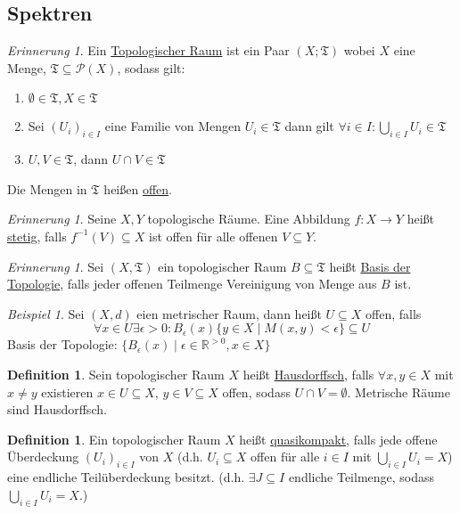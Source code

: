 \documentclass[10pt,a4paper]{article}
\newcommand{\R}{\ensuremath{\mathbb{R}}}
\newcommand{\ul}[1]{\underline{#1}}
\newcounter{thm}[section]
\theoremstyle{definition}
\newtheorem{definition}[thm]{Definition}
\theoremstyle{plain}
\theoremstyle{remark}
\newtheorem{rem}[thm]{Erinnerung}
\newtheorem{exm}[thm]{Beispiel}
\begin{document}
\subsection{Spektren}
\begin{rem}
	Ein \underline{Topologischer Raum} ist ein Paar $(X;\mathfrak T)$ wobei $X$ eine Menge, $\mathfrak T\subseteq \mathscr P(X)$, sodass gilt:
	\begin{enumerate}
		\item $\emptyset \in\mathfrak T,X\in\mathfrak T$
		\item Sei $(U_i)_{i\in I}$ eine Familie von Mengen $U_i\in\mathfrak T$ dann gilt $\forall i\in I:\bigcup_{i\in I}U_i\in\mathfrak T$
		\item $U,V\in\mathfrak T$, dann $U\cap V\in\mathfrak T$
	\end{enumerate}
Die Mengen in $\mathfrak T$ heißen \underline{offen}.
\end{rem}
\begin{rem}
	Seine $X,Y$ topologische Räume. Eine Abbildung $f:X\rightarrow Y$ heißt \ul{stetig}, falls $f^{-1}(V)\subseteq X$ ist offen für alle offenen $V\subseteq Y$.
\end{rem}
\begin{rem}
	Sei $(X,\mathfrak T)$ ein topologischer Raum $B\subseteq \mathfrak T$ heißt \ul{Basis der Topologie}, falls jeder offenen Teilmenge Vereinigung von Menge aus $B$ ist.
\end{rem}
\begin{exm}
	Sei $(X,d)$ eien metrischer Raum, dann heißt $U\subseteq X$ offen, falls \[\forall x\in U\exists\epsilon>0:B_\epsilon(x)\{y\in X\mid M(x,y)<\epsilon\}\subseteq U\]Basis der Topologie: $\{B_\epsilon(x)\mid\epsilon\in \R^{>0},x\in X\}$
\end{exm}
\begin{definition}
	Sein topologischer Raum $X$ heißt \underline{Hausdorffsch}, falls $\forall x,y\in X$ mit $x\neq y$ existieren $x\in U\subseteq X$, $y\in V\subseteq X$ offen, sodass $U\cap V=\emptyset$.
	Metrische Räume sind Hausdorffsch.
\end{definition}
\begin{definition}
	Ein topologischer Raum $X$ heißt \ul{quasikompakt}, falls jede offene Überdeckung $(U_i)_{i\in I}$ von $X$ (d.h. $U_i\subseteq X$ offen für alle $i\in I$ mit $\bigcup_{i\in I}U_i=X$) eine endliche Teilüberdeckung besitzt.
	(d.h. $\exists J\subseteq I$ endliche Teilmenge, sodass $\bigcup_{i\in I}U_i=X$.)
\end{definition}
\end{document}
